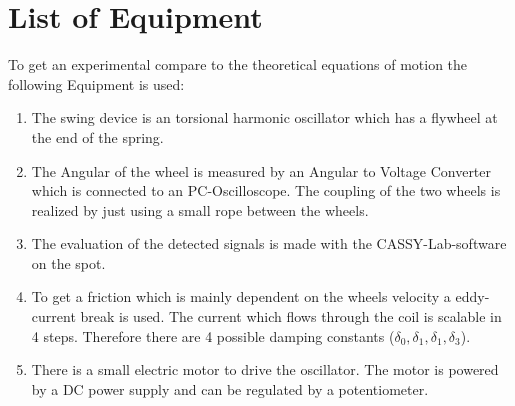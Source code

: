\newpage
\section{List of Equipment}
To get an experimental compare to the theoretical equations of motion the following Equipment is used:
\begin{enumerate}
\item The swing device is an torsional harmonic oscillator which has a flywheel at the end of the spring.
\item The Angular of the wheel is measured by an Angular to Voltage Converter which is connected to an PC-Oscilloscope. The coupling of the two wheels is realized by just using a small rope between the wheels.
\item The evaluation of the detected signals is made with the CASSY-Lab-software on the spot.
\item To get a friction which is mainly dependent on the wheels velocity a eddy-current break is used. The current which flows through the coil is  scalable in 4 steps. Therefore there are 4 possible damping constants (\(\delta_0, \delta_1, \delta_1, \delta_3 \)). 
\item There is a small electric motor to drive the oscillator. The motor is powered
by a DC power supply and can be regulated by a potentiometer.
\end{enumerate}